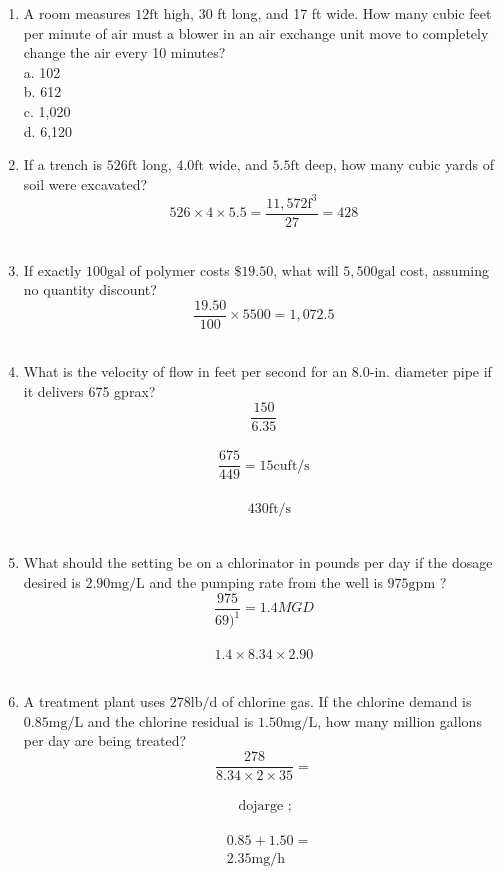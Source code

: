 \documentclass{article}
\begin{document}
\begin{enumerate}

\item A room measures $12 \mathrm{ft}$ high, 30 ft long, and 17 ft wide. How many cubic feet per minute of air must a blower in an air exchange unit move to completely change the air every 10 minutes?\\
a. 102\\
b. 612\\
c. 1,020\\
d. 6,120\\


\item If a trench is $526 \mathrm{ft}$ long, $4.0 \mathrm{ft}$ wide, and $5.5 \mathrm{ft}$ deep, how many cubic yards of soil were excavated?\\
$$526 \times 4 \times 5.5=\frac{11,572 \mathrm{f}^{3}}{27}=428$$\\

\item If exactly $100 \mathrm{gal}$ of polymer costs $\$ 19.50$, what will $5,500 \mathrm{gal}$ cost, assuming no quantity discount?\\
$$\frac{19.50}{100} \times 5500=1,072.5$$\\

\item What is the velocity of flow in feet per second for an 8.0-in. diameter pipe if it delivers 675 gprax?\\
$$\frac{150}{6.35}$$\\

$$\frac{675}{449}=15 \mathrm{cuft} / \mathrm{s}$$\\

$$\begin{aligned} & 430 \mathrm{ft} / \mathrm{s} \end{aligned}$$\\

\item What should the setting be on a chlorinator in pounds per day if the dosage desired is $2.90 \mathrm{mg} / \mathrm{L}$ and the pumping rate from the well is $975 \mathrm{gpm}$ ?\\
$$\frac{975}{69)^{1}}=1.4 MGD $$\\
$$1.4 \times 8.34 \times 2.90$$\\

\item A treatment plant uses $278 \mathrm{lb} / \mathrm{d}$ of chlorine gas. If the chlorine demand is $0.85 \mathrm{mg} / \mathrm{L}$ and the chlorine residual is $1.50 \mathrm{mg} / \mathrm{L}$, how many million gallons per day are being treated?\\
$$\frac{278}{8.34 \times 2 \times 35}=$$\\
$$\text { dojarge } ;$$\\
$$\begin{aligned}& 0.85+1.50= \\& 2.35 \mathrm{mg} / \mathrm{h}\end{aligned}$$\\


\end{enumerate}
\end{document}
